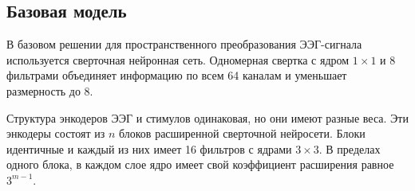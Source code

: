 \documentclass{article}
\begin{document}
    \subsection{Базовая модель}
    В базовом решении для пространственного преобразования ЭЭГ-сигнала используется сверточная нейронная сеть. Одномерная свертка с ядром $1 \times 1$ и 8 фильтрами объединяет информацию по всем 64 каналам и уменьшает размерность до 8. \par 
    Структура энкодеров ЭЭГ и стимулов одинаковая, но они имеют разные веса. Эти энкодеры состоят из $n$ блоков расширенной сверточной нейросети. Блоки идентичные и каждый из них имеет 16 фильтров с ядрами $3 \times 3$. В пределах одного блока, в каждом слое ядро имеет свой коэффициент расширения равное $3^{m-1}$.\par 
\end{document}
